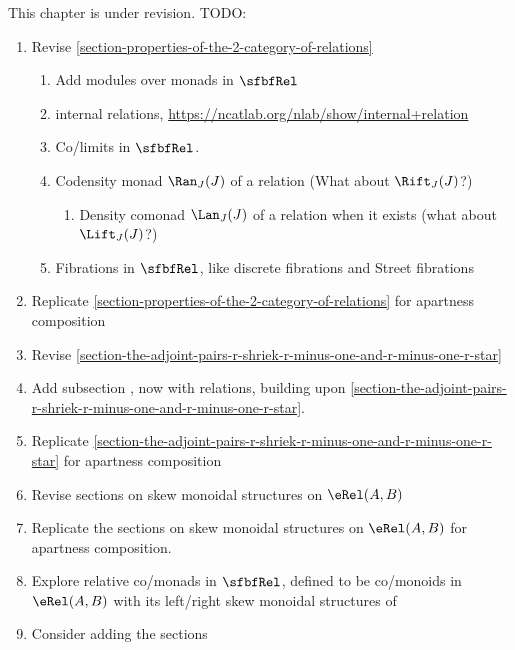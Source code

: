 This chapter is under revision. TODO:
\begin{enumerate}
    \item Revise \cref{section-properties-of-the-2-category-of-relations}
        \begin{enumerate}
            \item Add modules over monads in $\sfbfRel$
            \item internal relations, \url{https://ncatlab.org/nlab/show/internal+relation}
            \item Co/limits in $\sfbfRel$.
            \item Codensity monad $\Ran_{J}(J)$ of a relation (What about $\Rift_{J}(J)$?)
                \begin{enumerate}
                    \item Density comonad $\Lan_{J}(J)$ of a relation when it exists (what about $\Lift_{J}(J)$?)
                \end{enumerate}
            \item Fibrations in $\sfbfRel$, like discrete fibrations and Street fibrations
        \end{enumerate}
    \item Replicate \cref{section-properties-of-the-2-category-of-relations} for apartness composition
    \item Revise \cref{section-the-adjoint-pairs-r-shriek-r-minus-one-and-r-minus-one-r-star}
    \item Add subsection , now with relations, building upon \cref{section-the-adjoint-pairs-r-shriek-r-minus-one-and-r-minus-one-r-star}.
    \item Replicate \cref{section-the-adjoint-pairs-r-shriek-r-minus-one-and-r-minus-one-r-star} for apartness composition
    \item Revise sections on skew monoidal structures on $\eRel(A,B)$
    \item Replicate the sections on skew monoidal structures on $\eRel(A,B)$ for apartness composition.
    \item Explore relative co/monads in $\sfbfRel$, defined to be co/monoids in $\eRel(A,B)$ with its left/right skew monoidal structures of 
    \item Consider adding the sections

\end{enumerate}
